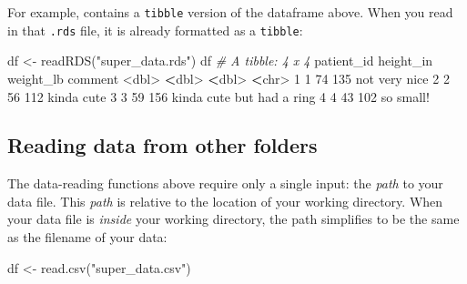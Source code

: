 \documentclass[
]{book}
\newenvironment{Shaded}{\begin{snugshade}}{\end{snugshade}}
\newcommand{\CommentTok}[1]{\textcolor[rgb]{0.56,0.35,0.01}{\textit{#1}}}
\newcommand{\DecValTok}[1]{\textcolor[rgb]{0.00,0.00,0.81}{#1}}
\newcommand{\ErrorTok}[1]{\textcolor[rgb]{0.64,0.00,0.00}{\textbf{#1}}}
\newcommand{\FunctionTok}[1]{\textcolor[rgb]{0.00,0.00,0.00}{#1}}
\newcommand{\NormalTok}[1]{#1}
\newcommand{\OtherTok}[1]{\textcolor[rgb]{0.56,0.35,0.01}{#1}}
\newcommand{\SpecialCharTok}[1]{\textcolor[rgb]{0.00,0.00,0.00}{#1}}
\newcommand{\StringTok}[1]{\textcolor[rgb]{0.31,0.60,0.02}{#1}}
\begin{document}
For example, contains a \texttt{tibble} version of the dataframe above. When you read in that \texttt{.rds} file, it is already formatted as a \texttt{tibble}:

\begin{Shaded}
\begin{Highlighting}[]
\NormalTok{df }\OtherTok{\textless{}{-}} \FunctionTok{readRDS}\NormalTok{(}\StringTok{"super\_data.rds"}\NormalTok{)}
\NormalTok{df}
\CommentTok{\# A tibble: 4 x 4}
\NormalTok{  patient\_id height\_in weight\_lb comment                  }
       \SpecialCharTok{\textless{}}\NormalTok{dbl}\SpecialCharTok{\textgreater{}}     \ErrorTok{\textless{}}\NormalTok{dbl}\SpecialCharTok{\textgreater{}}     \ErrorTok{\textless{}}\NormalTok{dbl}\SpecialCharTok{\textgreater{}} \ErrorTok{\textless{}}\NormalTok{chr}\SpecialCharTok{\textgreater{}}                    
\DecValTok{1}          \DecValTok{1}        \DecValTok{74}       \DecValTok{135}\NormalTok{ not very nice            }
\DecValTok{2}          \DecValTok{2}        \DecValTok{56}       \DecValTok{112}\NormalTok{ kinda cute               }
\DecValTok{3}          \DecValTok{3}        \DecValTok{59}       \DecValTok{156}\NormalTok{ kinda cute but had a ring}
\DecValTok{4}          \DecValTok{4}        \DecValTok{43}       \DecValTok{102}\NormalTok{ so small}\SpecialCharTok{!}                
\end{Highlighting}
\end{Shaded}

\hypertarget{reading-data-from-other-folders}{%
\subsection*{Reading data from other folders}\label{reading-data-from-other-folders}}

The data-reading functions above require only a single input: the \emph{path} to your data file. This \emph{path} is relative to the location of your working directory. When your data file is \emph{inside} your working directory, the path simplifies to be the same as the filename of your data:

\begin{Shaded}
\begin{Highlighting}[]
\NormalTok{df }\OtherTok{\textless{}{-}} \FunctionTok{read.csv}\NormalTok{(}\StringTok{"super\_data.csv"}\NormalTok{)}
\end{Highlighting}
\end{Shaded}
\end{document}
